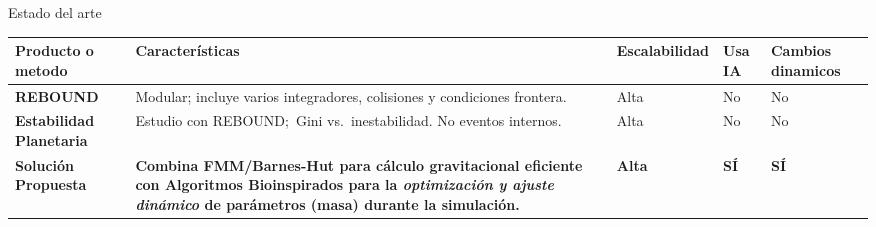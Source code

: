 \begin{frame}{Estado del arte}
    \centering
    \label{tab:arte}
    \vspace{-0.1cm}
    \begin{adjustbox}{max width=0.9\textwidth,max height=0.7\textheight, keepaspectratio}
        \renewcommand{\arraystretch}{1.3}
            \begin{tabular}{@{}>{\bfseries}p{} p{} p{} p{} p{}@{}}
            \toprule
            \textbf{Producto o metodo} & \textbf{Características} & \textbf{Escalabilidad} & \textbf{Usa IA} & \textbf{Cambios dinamicos} \\
            \midrule
            REBOUND & Modular; incluye varios integradores, colisiones y condiciones frontera. & Alta & No & No \\
            Estabilidad Planetaria & Estudio con REBOUND;\ Gini vs.\ inestabilidad. No eventos internos. & Alta & No & No \\
            \midrule
            \rowcolor{yellow!20}
            \textbf{Solución Propuesta} & \textbf{Combina FMM/Barnes-Hut para cálculo gravitacional eficiente con Algoritmos Bioinspirados para la \textit{optimización y ajuste dinámico} de parámetros (masa) durante la simulación.}  & \textbf{Alta} & \textbf{SÍ} & \textbf{SÍ} \\
            \bottomrule
            \end{tabular}
    \end{adjustbox}
    \smallskip
\end{frame}

